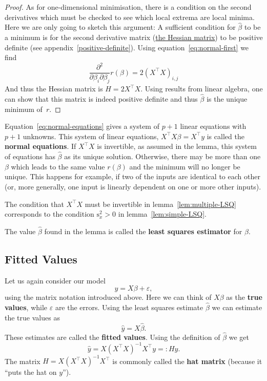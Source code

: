 \documentclass[
  a4paper,
]{article}
\theoremstyle{definition}
\theoremstyle{definition}
\theoremstyle{definition}
\theoremstyle{definition}
\theoremstyle{remark}
\begin{document}
\begin{proof}
As for one-dimensional minimisation, there is a condition on the
second derivatives which must be checked to see which local extrema
are local minima. Here we are only going to sketch this argument: A
sufficient condition for \(\hat\beta\) to be a minimum is for the
second derivative matrix (\href{https://en.wikipedia.org/wiki/Hessian_matrix}{the Hessian
matrix})
to be positive definite (see appendix~\ref{positive-definite}).
Using equation~\eqref{eq:normal-first} we find
\begin{equation*}
    \frac{\partial^2}{\partial\beta_i \partial\beta_j} r(\beta)
    = 2 (X^\top X)_{i,j}
  \end{equation*}
And thus the Hessian matrix is \(H = 2 X^\top X\). Using results from
linear algebra, one can show that this matrix is indeed positive
definite and thus \(\hat\beta\) is the unique minimum of~\(r\).
\end{proof}

Equation~\eqref{eq:normal-equations} gives a system of \(p+1\) linear
equations with \(p+1\) unknowns. This system of linear equations,
\(X^\top X \beta = X^\top y\) is called the \textbf{normal equations}.
If \(X^\top X\) is invertible, as assumed in the lemma, this
system of equations has \(\hat\beta\) as its unique solution.
Otherwise, there may be more than one \(\beta\) which leads to the
same value \(r(\beta)\) and the minimum will no longer be unique.
This happens for example, if two of the inputs are identical to
each other (or, more generally, one input is linearly dependent
on one or more other inputs).

The condition that \(X^\top X\) must be invertible in
lemma~\ref{lem:multiple-LSQ}
corresponds to the condition \(\mathrm{s}_x^2 > 0\) in
lemma~\ref{lem:simple-LSQ}.

The value \(\hat\beta\) found in the lemma is called the \textbf{least squares
estimator} for \(\beta\).

\subsection{Fitted Values}\label{fitted-values}

Let us again consider our model
\begin{equation*}
  y = X \beta + \varepsilon,
\end{equation*}
using the matrix notation introduced above. Here we can think of
\(X\beta\) as the \textbf{true values}, while \(\varepsilon\) are the errors.
Using the least squares estimate \(\hat\beta\) we can estimate the true
values as
\begin{equation}
  \hat y = X \hat\beta.  \label{eq:fitted-values}
\end{equation}
These estimates are called the \textbf{fitted values}. Using the
definition of \(\hat\beta\) we get
\begin{equation*}
  \hat y
  = X (X^\top X)^{-1} X^\top y
  =: Hy.
\end{equation*}
The matrix \(H = X (X^\top X)^{-1} X^\top\) is commonly called the \textbf{hat
matrix} (because it ``puts the hat on \(y\)'').
\end{document}
